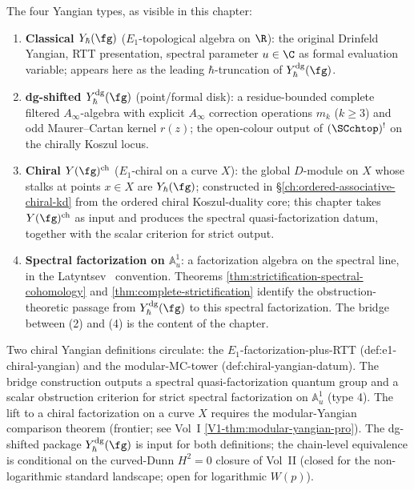 \begin{convention}
\label{conv:dg-shifted-bridge-yangian-types}
The four Yangian types, as visible in this chapter:
\begin{enumerate}[label=\textup{(\arabic*)}]
\item \textbf{Classical $Y_\hbar(\fg)$} ($E_1$-topological algebra
on $\R$): the original Drinfeld Yangian, RTT presentation,
spectral parameter $u\in\C$ as formal evaluation variable;
appears here as the leading $\hbar$-truncation of
$Y^{\mathrm{dg}}_\hbar(\fg)$.
\item \textbf{dg-shifted $Y^{\mathrm{dg}}_\hbar(\fg)$} (point/formal
disk): a residue-bounded complete filtered $A_\infty$-algebra with
explicit $A_\infty$ correction operations $m_k$ ($k\ge 3$) and odd
Maurer--Cartan kernel $r(z)$; the open-colour output of
$(\SCchtop)^{!}$ on the chirally Koszul locus.
\item \textbf{Chiral $Y(\fg)^{\mathrm{ch}}$} ($E_1$-chiral on a
curve $X$): the global $D$-module on $X$ whose stalks at points
$x\in X$ are $Y_\hbar(\fg)$; constructed in
\S\ref{ch:ordered-associative-chiral-kd} from the ordered
chiral Koszul-duality core; this chapter takes
$Y(\fg)^{\mathrm{ch}}$ as input and produces the spectral
quasi-factorization datum, together with the scalar criterion for
strict output.
\item \textbf{Spectral factorization on $\mathbb{A}^1_u$}:
a factorization algebra on the spectral line, in the
Latyntsev~\cite{Latyntsev23} convention. Theorems
\ref{thm:strictification-spectral-cohomology} and
\ref{thm:complete-strictification} identify the obstruction-theoretic
passage from $Y^{\mathrm{dg}}_\hbar(\fg)$ to this spectral
factorization. The bridge between (2) and (4) is the content of the
chapter.
\end{enumerate}
\end{convention}

\begin{remark}
\label{rem:dg-shifted-bridge-two-definitions}
Two chiral Yangian definitions circulate: the
$E_1$-factorization-plus-RTT (def:e1-chiral-yangian) and the
modular-MC-tower (def:chiral-yangian-datum). The bridge construction
outputs a spectral quasi-factorization quantum group and a scalar
obstruction criterion for strict spectral factorization on
$\mathbb{A}^1_u$ (type 4). The lift to a chiral factorization on a
curve $X$ requires the modular-Yangian comparison theorem (frontier;
see Vol~I \cref{V1-thm:modular-yangian-pro}). The dg-shifted package
$Y^{\mathrm{dg}}_\hbar(\fg)$ is input for both definitions; the
chain-level equivalence is conditional on the curved-Dunn $H^2 = 0$
closure of Vol~II (closed for the non-logarithmic standard landscape;
open for logarithmic $W(p)$).
\end{remark}

